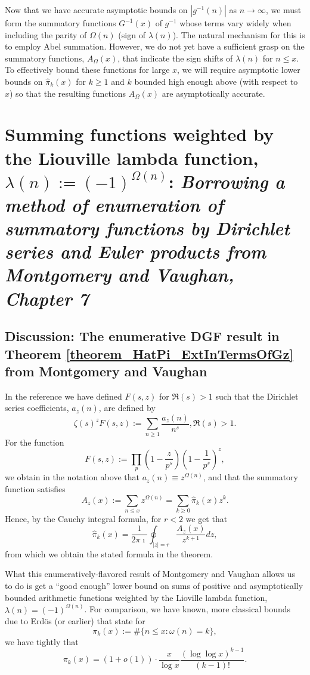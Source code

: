 \documentclass[11pt,reqno,a4letter]{article}
\numberwithin{figure}{section}
\numberwithin{table}{section}
\theoremstyle{plain}
\numberwithin{theorem}{section}
\theoremstyle{definition}
\begin{document}
Now that we have accurate asymptotic bounds on $|g^{-1}(n)|$ as $n \rightarrow \infty$, we must form the 
summatory functions $G^{-1}(x)$ of $g^{-1}$ whose terms vary widely when including the parity of 
$\Omega(n)$ (sign of $\lambda(n)$). The natural mechanism for this is to employ Abel summation. 
However, we do not yet have a sufficient grasp on the summatory functions, 
$A_{\Omega}(x)$, that indicate the sign shifts of $\lambda(n)$ for $n \leq x$. 
To effectively bound these functions for large $x$, we will require asymptotic lower bounds 
on $\widehat{\pi}_k(x)$ for $k \geq 1$ and $k$ bounded high enough above (with respect to $x$) so that 
the resulting functions $A_{\Omega}(x)$ are asymptotically accurate. 

\newpage 
\section{Summing functions weighted by the Liouville lambda function, $\lambda(n) := (-1)^{\Omega(n)}$: 
         \textit{
         Borrowing a method of enumeration of summatory functions by Dirichlet series and Euler products 
         from Montgomery and Vaughan, Chapter 7} 
        } 
\label{Section_MVCh7_GzBounds} 
        
\subsection{Discussion: The enumerative DGF result in Theorem \ref{theorem_HatPi_ExtInTermsOfGz} from 
            Montgomery and Vaughan} 

In the reference we have defined $F(s, z)$ for $\Re(s) > 1$ such that the 
Dirichlet series coefficients, $a_z(n)$, are defined by 
\[
\zeta(s)^z F(s, z) := \sum_{n \geq 1} \frac{a_z(n)}{n^s}, \Re(s) > 1. 
\]
For the function 
\[
F(s, z) := \prod_p \left(1 - \frac{z}{p^s}\right) \left(1-\frac{1}{p^s}\right)^z, 
\]
we obtain in the notation above that $a_z(n) \equiv z^{\Omega(n)}$, and that the summatory 
function satisfies 
\[
A_z(x) := \sum_{n \leq x} z^{\Omega(n)} = \sum_{k \geq 0} \widehat{\pi}_k(x) z^k. 
\]
Hence, by the Cauchy integral formula, for $r < 2$ we get that 
\[
\widehat{\pi}_k(x) = \frac{1}{2\pi\imath} \oint_{|z|=r} \frac{A_z(x)}{z^{k+1}} dz, 
\]
from which we obtain the stated formula in the theorem. 

What this enumeratively-flavored result of Montgomery and Vaughan allows us to do is get a 
``good enough'' lower bound on sums of positive and asymptotically bounded arithmetic functions 
weighted by the Lioville lambda function, $\lambda(n) = (-1)^{\Omega(n)}$. 
For comparison, we have known, more classical bounds due to Erd\"os (or earlier) that state for 
\[
\pi_k(x) := \#\{n \leq x: \omega(n) = k\}, 
\]
we have tightly that \cite{TODO,MV} 
\[
\pi_k(x) = (1 + o(1)) \cdot \frac{x}{\log x} \frac{(\log\log x)^{k-1}}{(k-1)!}. 
\] 
\end{document}
